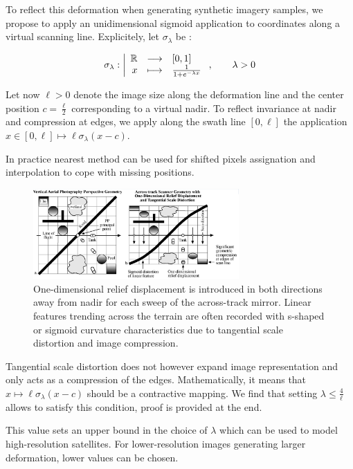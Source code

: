 \documentclass[11pt]{scrartcl}
\begin{document}
To reflect this deformation when generating synthetic imagery samples, we propose to apply an unidimensional sigmoid application to coordinates along a virtual scanning line. Explicitely, let $\sigma_\lambda$ be :

$$
{\sigma_\lambda}: \left| \begin{array}{rcl} {{\mathbb R}} & \longrightarrow & {[0,1]} \\ {x} & \longmapsto & {\frac{1}{1 + e^{-\lambda x}}} \\ \end{array} \right., \qquad \lambda >0
$$

Let now $\ell>0$ denote the image size along the deformation line and the center position $c = \frac{\ell}{2}$ corresponding to a virtual nadir. To reflect invariance at nadir and compression at edges, we apply along the swath line $[0, \ell]$ the application $x\in[0, \ell]\longmapsto\ell\sigma_\lambda(x - c)$.

In practice nearest method can be used for shifted pixels assignation and interpolation to cope with missing positions.

\begin{figure}[H]\label{img:deformation}
\centering
\includegraphics[width=0.7\textwidth]{img/sigmoid_deformation.png}
\caption{One-dimensional relief displacement is introduced in both directions away from nadir for each sweep of the across-track mirror. Linear features trending across the terrain are often recorded with s-shaped or sigmoid curvature characteristics due to tangential scale distortion and image compression.}
\end{figure}





Tangential scale distortion does not however expand image representation and only acts as a compression of the edges. Mathematically, it means that $x\mapsto\ell\sigma_\lambda(x - c)$ should be a contractive mapping. We find that setting $\lambda \leq \frac{4}{\ell}$ allows to satisfy this condition, proof is provided at the end.

This value sets an upper bound in the choice of $\lambda$ which can be used to model high-resolution satellites. For lower-resolution images generating larger deformation, lower values can be chosen.
\end{document}
